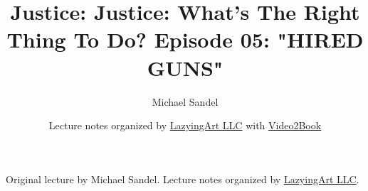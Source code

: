 \documentclass[11pt,oneside]{book}
\begin{document}
\frontmatter
\title{Justice: Justice: What's The Right Thing To Do? Episode 05: "HIRED GUNS"}
\author{Michael Sandel}
\date{Lecture notes organized by \href{https://lazying.art}{LazyingArt LLC} with \href{https://github.com/lachlanchen/Video2Book}{Video2Book}}
\maketitle
\begin{center}
\small Original lecture by Michael Sandel. Lecture notes organized by \href{https://lazying.art}{LazyingArt LLC}.
\end{center}
\clearpage
\mainmatter

\end{document}
